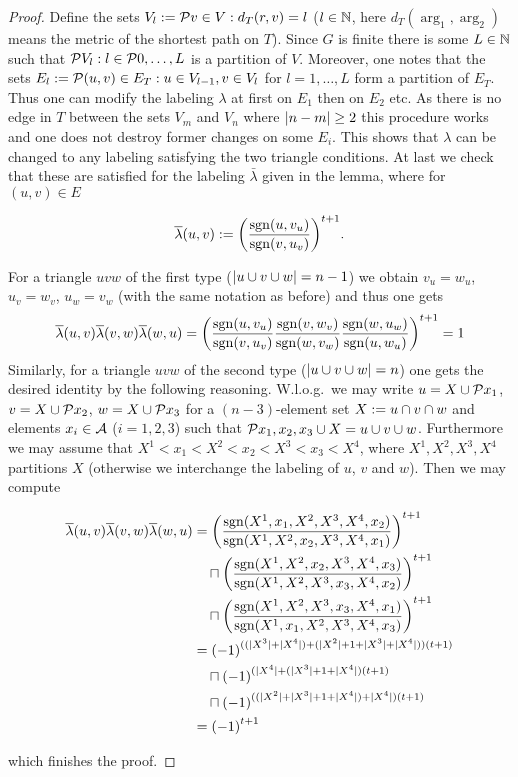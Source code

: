 \begin{proof}
    Define the sets $V_l:=\set{v\in V: d_T(r,v)=l}$ ($l\in\mathbb{N}$, here $d_T(\arg_1,\arg_2)$ means the metric of the shortest path on $T$). Since $G$ is finite there is some $L\in\mathbb{N}$ such that $\set{V_l:l\in\set{0,\ldots,L}}$ is a partition of $V$. Moreover, one notes that the sets $E_l:=\set{(u,v)\in E_T:u\in V_{l-1},v\in V_l}$ for $l=1,\ldots,L$ form a partition of $E_T$. Thus one can modify the labeling $\lambda$ at first on $E_1$ then on $E_2$ etc. As there is no edge in $T$ between the sets $V_m$ and $V_n$ where $\left|n-m\right|\geq 2$ this procedure works and one does not destroy former changes on some $E_i$. 
    This shows that $\lambda$ can be changed to any labeling satisfying the two triangle conditions.
    At last we check that these are satisfied for the labeling $\bar{\lambda}$ given in the lemma, where for $(u,v)\in E$

    $$
    \overline{\lambda}(u,v):={\left(\frac{\mathop\mathrm{sgn}(u,v_u)}{\mathop\mathrm{sgn}(v,u_v)}\right)}^{t+1}\text{.}
    $$
    
    For a triangle $uvw$ of the first type ($\left|u\cup v\cup w\right|=n-1$) we obtain $v_u=w_u$, $u_v=w_v$, $u_w=v_w$ (with the same notation as before) and thus one gets
    $$
    \overline{\lambda}(u,v)\overline{\lambda}(v,w)\overline{\lambda}(w,u) ={\left(\frac{\mathop\mathrm{sgn}(u,v_u)}{\mathop\mathrm{sgn}(v,u_v)}\frac{\mathop\mathrm{sgn}(v,w_v)}{\mathop\mathrm{sgn}(w,v_w)}\frac{\mathop\mathrm{sgn}(w,u_w)}{\mathop\mathrm{sgn}(u,w_u)}\right)}^{t+1}\\
    =1
    $$
    Similarly, for a triangle $uvw$ of the second type ($\left|u\cup v\cup w\right|=n$) one gets the desired identity by the following reasoning. W.l.o.g.\ we may write $u=X\setjoin\set{x_1}$, $v=X\setjoin\set{x_2}$, $w=X\setjoin\set{x_3}$ for a $(n-3)$-element set $X:=u\cap v\cap w$ and elements $x_i\in \mathcal{A}$ ($i=1,2,3$) such that $\set{x_1,x_2,x_3}\setjoin X=u\setjoin v\setjoin w$. Furthermore we may assume that $X^1<x_1<X^2<x_2<X^3<x_3<X^4$, where $X^1,X^2,X^3,X^4$ partitions $X$ (otherwise we interchange the labeling of $u$, $v$ and $w$). Then we may compute

    \begin{align*}
        \bar{\lambda}(u,v)\bar{\lambda}(v,w)\bar{\lambda}(w,u) 
 & = \left(\frac{\sgn(X^1,x_1,X^2,X^3,X^4,x_2)}{\sgn(X^1,X^2,x_2,X^3,X^4,x_1)}\right)^{t+1}              \\
 & \quad\setprod \left(\frac{\sgn(X^1,X^2,x_2,X^3,X^4,x_3)}{\sgn(X^1,X^2,X^3,x_3,X^4,x_2)}\right)^{t+1} \\
 & \quad\setprod \left(\frac{\sgn(X^1,X^2,X^3,x_3,X^4,x_1)}{\sgn(X^1,x_1,X^2,X^3,X^4,x_3)}\right)^{t+1} \\
 & = {(-1)}^{((|X^3|+|X^4|)+(|X^2|+1+|X^3|+|X^4|))(t+1)}                                                 \\
 & \quad\setprod {(-1)}^{(|X^4|+(|X^3|+1+|X^4|)(t+1)}                                                   \\
 & \quad\setprod {(-1)}^{((|X^2|+|X^3|+1+|X^4|)+|X^4|)(t+1)}                                            \\
 & = {(-1)}^{t+1}
\end{align*}

  which finishes the proof.
\end{proof}


